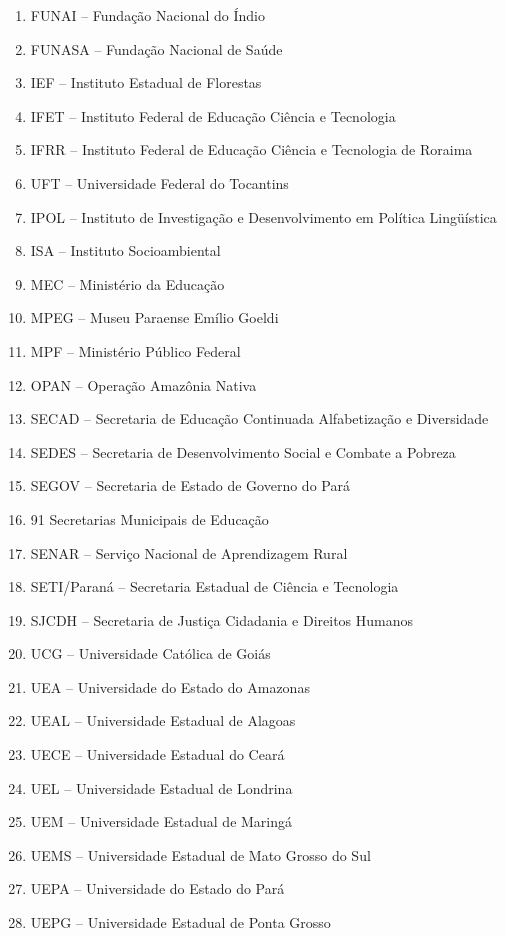 \documentclass[
]{book}
\begin{document}
\begin{enumerate}
\item
  FUNAI -- Fundação Nacional do Índio
\item
  FUNASA -- Fundação Nacional de Saúde
\item
  IEF -- Instituto Estadual de Florestas
\item
  IFET -- Instituto Federal de Educação Ciência e Tecnologia
\item
  IFRR -- Instituto Federal de Educação Ciência e Tecnologia de Roraima
\item
  UFT -- Universidade Federal do Tocantins
\item
  IPOL -- Instituto de Investigação e Desenvolvimento em Política Lingüística
\item
  ISA -- Instituto Socioambiental
\item
  MEC -- Ministério da Educação
\item
  MPEG -- Museu Paraense Emílio Goeldi
\item
  MPF -- Ministério Público Federal
\item
  OPAN -- Operação Amazônia Nativa
\item
  SECAD -- Secretaria de Educação Continuada Alfabetização e Diversidade
\item
  SEDES -- Secretaria de Desenvolvimento Social e Combate a Pobreza
\item
  SEGOV -- Secretaria de Estado de Governo do Pará
\item
  91 Secretarias Municipais de Educação
\item
  SENAR -- Serviço Nacional de Aprendizagem Rural
\item
  SETI/Paraná -- Secretaria Estadual de Ciência e Tecnologia
\item
  SJCDH -- Secretaria de Justiça Cidadania e Direitos Humanos
\item
  UCG -- Universidade Católica de Goiás
\item
  UEA -- Universidade do Estado do Amazonas
\item
  UEAL -- Universidade Estadual de Alagoas
\item
  UECE -- Universidade Estadual do Ceará
\item
  UEL -- Universidade Estadual de Londrina
\item
  UEM -- Universidade Estadual de Maringá
\item
  UEMS -- Universidade Estadual de Mato Grosso do Sul
\item
  UEPA -- Universidade do Estado do Pará
\item
  UEPG -- Universidade Estadual de Ponta Grosso

\end{enumerate}
\end{document}
